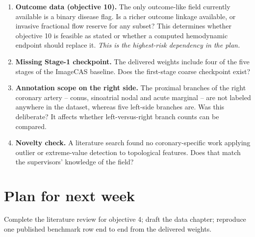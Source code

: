 \begin{enumerate}
  \item \textbf{Outcome data (objective 10).} The only outcome-like field currently available
    is a binary disease flag. Is a richer outcome linkage available, or invasive fractional
    flow reserve for any subset? This determines whether objective 10 is feasible as stated
    or whether a computed hemodynamic endpoint should replace it. \emph{This is the
    highest-risk dependency in the plan.}
  \item \textbf{Missing Stage-1 checkpoint.} The delivered weights include four of the five
    stages of the ImageCAS baseline. Does the first-stage coarse checkpoint exist?
  \item \textbf{Annotation scope on the right side.} The proximal branches of the right
    coronary artery -- conus, sinoatrial nodal and acute marginal -- are not labeled anywhere
    in the dataset, whereas five left-side branches are. Was this deliberate? It affects
    whether left-versus-right branch counts can be compared.
  \item \textbf{Novelty check.} A literature search found no coronary-specific work applying
    outlier or extreme-value detection to topological features. Does that match the
    supervisors' knowledge of the field?
\end{enumerate}

\section*{Plan for next week}

Complete the literature review for objective 4; draft the data chapter; reproduce one
published benchmark row end to end from the delivered weights.
